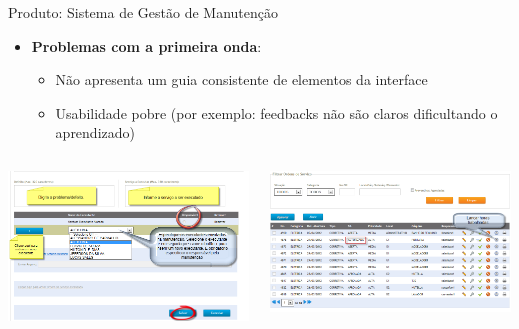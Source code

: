 \begin{frame}{Produto: Sistema de Gestão de Manutenção}
	\begin{itemize}
		\item \textbf{Problemas com a primeira onda}:
		\begin{itemize}
			\item Não apresenta um \alert{guia consistente} de elementos da interface 
			\item Usabilidade \alert{pobre} (por exemplo: feedbacks não são claros dificultando o aprendizado)
		\end{itemize}
	\end{itemize}
		
	\framebreak
		
		\begin{columns}
			\begin{column}{0.45\textwidth}
				\includegraphics[width=1\textwidth]{imagens/sgm-07}
			\end{column}
			\begin{column}{0.45\textwidth}
				\includegraphics[width=1\textwidth]{imagens/sgm-08}
			\end{column}
		\end{columns}


\end{frame}
